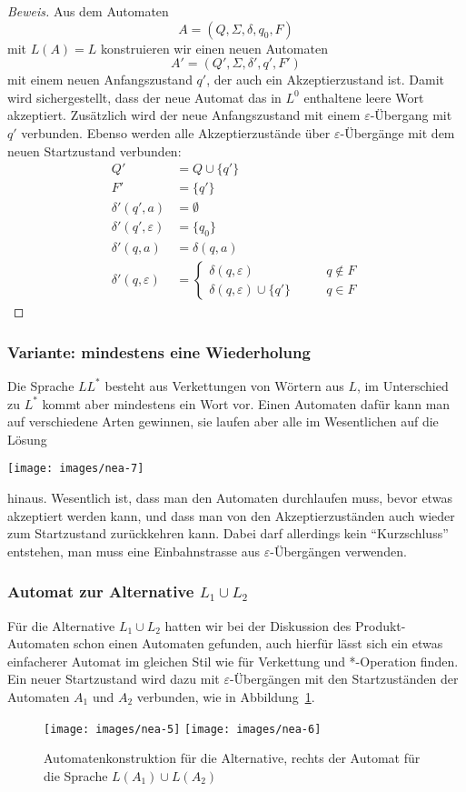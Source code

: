 \begin{proof}[Beweis]
Aus dem Automaten
\[
A=(Q,\Sigma, \delta,q_0,F)
\]
mit $L(A)=L$ konstruieren wir einen neuen
Automaten
\[
A'=(Q',\Sigma,\delta',q',F')
\]
mit einem neuen Anfangszustand $q'$, der auch
ein Akzeptierzustand ist.
Damit wird sichergestellt, dass der neue Automat das in $L^0$
enthaltene leere Wort akzeptiert.
Zusätzlich wird der neue Anfangszustand mit einem $\varepsilon$-Übergang
mit $q'$ verbunden.
Ebenso werden alle Akzeptierzustände über $\varepsilon$-Übergänge
mit dem neuen Startzustand verbunden:
\begin{align*}
Q'&=Q\cup \{q'\}\\
F'&=\{q'\}\\
\delta'(q',a)&=\emptyset\\
\delta'(q',\varepsilon)&= \{q_0\}\\
\delta'(q,a)&= \delta(q,a)\\
\delta'(q,\varepsilon)&=\begin{cases}
\delta(q,\varepsilon)          &\qquad q\not\in F\\
\delta(q,\varepsilon)\cup\{q'\}&\qquad q\in F
\end{cases}
\end{align*}
\end{proof}
\subsubsection{Variante: mindestens eine Wiederholung}
Die Sprache $LL^*$ besteht aus Verkettungen von Wörtern aus $L$,
im Unterschied zu $L^*$ kommt aber mindestens ein Wort vor.
Einen Automaten dafür kann man auf verschiedene Arten gewinnen,
sie laufen aber alle im Wesentlichen auf die Lösung
\begin{center}
\texttt{[image: images/nea-7]}
\end{center}
hinaus.
Wesentlich ist, dass man den Automaten durchlaufen muss, bevor
etwas akzeptiert werden kann, und dass man von den Akzeptierzuständen
auch wieder zum Startzustand zurückkehren kann.
Dabei darf allerdings
kein ``Kurzschluss'' entstehen, man muss eine Einbahnstrasse aus
$\varepsilon$-Übergängen verwenden.

\subsubsection{Automat zur Alternative $L_1\cup L_2$}
%
%
Für die Alternative $L_1\cup L_2$ hatten wir bei der Diskussion
des Produkt-Automaten schon einen Automaten gefunden, auch
hierfür lässt sich ein etwas einfacherer Automat im gleichen
Stil wie für Verkettung und *-Operation finden.
Ein neuer Startzustand
wird dazu mit $\varepsilon$-Übergängen mit den Startzuständen
der Automaten $A_1$ und $A_2$ verbunden, wie in Abbildung~\ref{neaalternative}.
\begin{figure}
\begin{center}
\texttt{[image: images/nea-5]}
\qquad
\qquad
\texttt{[image: images/nea-6]}
\end{center}
\caption{Automatenkonstruktion für die Alternative, rechts der Automat
für die Sprache $L(A_1)\cup L(A_2)$\label{neaalternative}}
\end{figure}

